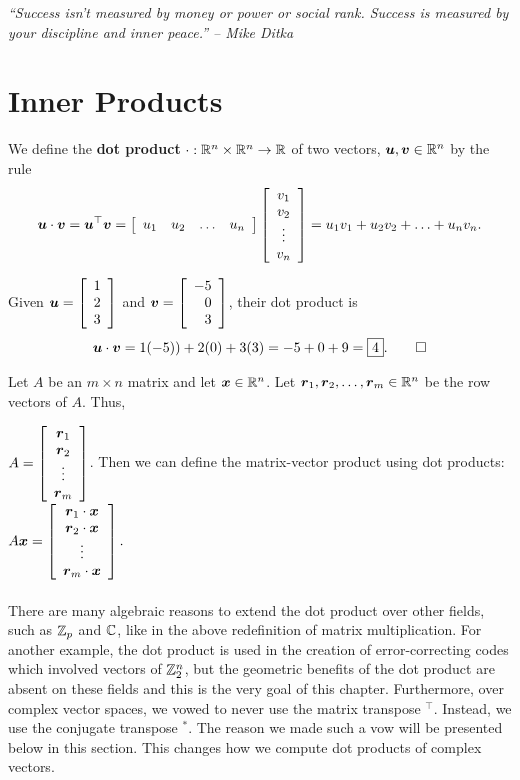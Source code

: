
\begin{center} 
\emph{``Success isn't measured by money or power or social rank. Success is measured by your discipline and inner peace.'' -- Mike Ditka}
\end{center}

\section{Inner Products}\label{sec:inner}
\begin{Def} We define the \textbf{dot product} $\cdot : \R^n\times \R^n \to \R$ of two vectors, $\bb u, \bb v \in \R^n$ by the rule
\[\bb u \cdot \bb v = \bb u^\top \bb v = \mtx{cccc}{u_1 & u_2 & \ldots & u_n}\mtx{c}{v_1 \\ v_2 \\ \vdots \\ v_n} = u_1v_1 + u_2v_2 + \ldots + u_nv_n.\]
\end{Def}\vs

\begin{Exam} Given $\bb u = \vr{1\\2\\3}$ and $\bb v = \vr{-5\\0\\3}$, their dot product is 
\[\bb u \cdot \bb v = 1(-5)) +2(0) + 3(3) = -5 +0 + 9 = \fbox{$4$}. \qedhere\]
\end{Exam}\vs

Let $A$ be an $m\times n$ matrix and let $\bb x\in \R^n$. Let $\bb r_1, \bb r_2,\ldots, \bb r_m\in \R^n$  be the row vectors of $A$. Thus,

$A = \mtx{c}{\bb r_1\\ \bb r_2\\ \vdots \\ \bb r_m}$. Then we can define the matrix-vector product using dot products: $A\bb x = \mtx{c}{\bb r_1\cdot \bb x\\ \bb r_2\cdot \bb x \\ \vdots\\ \bb r_m\cdot \bb x}.$\\\\

There are many algebraic reasons to extend the dot product over other fields, such as $\Z_p$ and $\C$, like in the above redefinition of matrix multiplication. For another example, the dot product is used in the creation of error-correcting codes which involved vectors of $\Z_2^n$, but the geometric benefits of the dot product are absent on these fields and this is the very goal of this chapter. Furthermore, over complex vector spaces, we vowed to never use the matrix transpose $\mbox{}^\top $. Instead, we use the conjugate transpose $\mbox{}^*$. The reason we made such a vow will be presented below in this section. This changes how we compute dot products of complex vectors.\\

